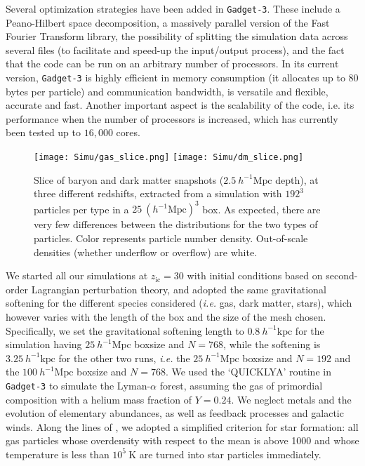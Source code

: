 Several optimization strategies have been added in \texttt{Gadget-3}. These include a Peano-Hilbert space decomposition, a massively parallel version of the Fast Fourier Transform library,  the possibility of splitting the simulation data across several files (to facilitate and speed-up the input/output process), and the fact that the code can be run on an arbitrary number of processors. In its current version, \texttt{Gadget-3} is highly efficient in memory consumption (it allocates up to $80$ bytes per particle) and communication bandwidth, is versatile and flexible, accurate and fast. Another important aspect  is the scalability of the code, i.e. its
performance when the number of processors is increased, which has currently been tested up to $16,000$ cores.\\

\begin{figure}
\centering
\texttt{[image: Simu/gas\_slice.png]}
\hfill
\texttt{[image: Simu/dm\_slice.png]}
\caption{Slice of baryon and dark matter snapshots ($2.5~h^{-1}\mathrm{Mpc}$ depth), at three different redshifts, extracted from a simulation with $192^3$ particles per type in a 
$25~(h^{-1}\mathrm{Mpc})^3$ box. As expected, there are very few
differences between the distributions for the two types of particles. Color represents particle number density. Out-of-scale densities (whether underflow or overflow) are white.}
\label{fig:slices}
\end{figure}

We started all our simulations at $z_{\mathrm{ic}}=30$ with initial conditions based on second-order Lagrangian perturbation theory\citep{Crocce2006}, and adopted the same gravitational softening for the different species considered (\textit{i.e.} gas, dark matter, stars), which however varies with the length of the box and the size of the mesh chosen. Specifically, we set the gravitational softening length to $0.8~h^{-1}\mathrm{kpc}$ for the simulation having $25~h^{-1}\mathrm{Mpc}$ boxsize and $N=768$, while the softening is $3.25~h^{-1}\mathrm{kpc}$ for the other two runs, \textit{i.e.} the $25~h^{-1}\mathrm{Mpc}$ boxsize and $N=192$ and the $100~h^{-1}\mathrm{Mpc}$ boxsize and $N=768$.  We used the `QUICKLYA' routine in \texttt{Gadget-3} to simulate the Lyman-$\alpha$ forest, assuming the gas of  primordial composition with a helium mass fraction of $Y=0.24$. We neglect metals and the evolution of elementary  abundances, as well as feedback processes and galactic winds. Along the lines of \cite{Viel2010}, we adopted a simplified criterion for star formation: all gas particles whose overdensity with respect to the mean is above 1000 and whose temperature is less than $10^5~\mathrm{K}$ are turned into star particles immediately. 


\clearpage